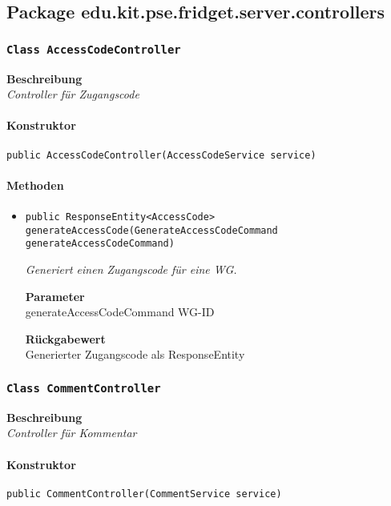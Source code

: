 

%
    \subsection{Package edu.kit.pse.fridget.server.controllers}
    \subsubsection{\texttt{Class AccessCodeController}}
    \textbf{Beschreibung} \\
    \textit{Controller für Zugangscode}
    \paragraph*{Konstruktor}
    \texttt{public AccessCodeController(AccessCodeService service)}
    \paragraph*{Methoden}
    \begin{itemize}
    	\item{\texttt{public ResponseEntity<AccessCode> generateAccessCode(GenerateAccessCodeCommand generateAccessCodeCommand)}}
    	
    	\textit{Generiert einen Zugangscode für eine WG.}
    	
    	\textbf{Parameter} \\
    	generateAccessCodeCommand WG-ID
    	
    	\textbf{Rückgabewert} \\
    	Generierter Zugangscode als ResponseEntity
    \end{itemize}
    \subsubsection{\texttt{Class CommentController}}
    \textbf{Beschreibung} \\
    \textit{Controller für Kommentar}
    \paragraph*{Konstruktor}
    \texttt{public CommentController(CommentService service)}

